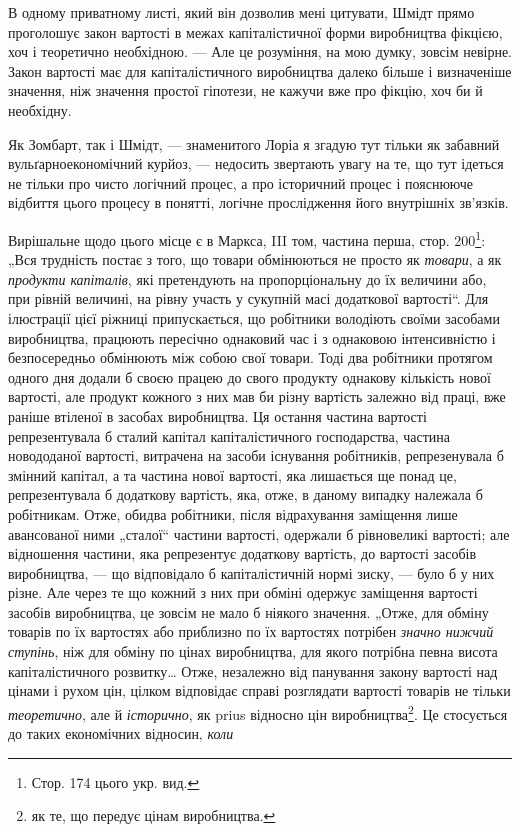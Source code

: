 \parcont{}  %
В одному приватному листі, який він дозволив мені цитувати, Шмідт прямо проголошує закон вартості в межах капіталістичної форми
виробництва фікцією, хоч і теоретично необхідною. — Але це розуміння, на мою думку, зовсім невірне. Закон вартості має для
капіталістичного виробництва далеко більше і визначеніше значення, ніж значення простої гіпотези, не кажучи вже про фікцію,
хоч би й необхідну.

Як Зомбарт, так і Шмідт, — знаменитого Лоріа я згадую тут тільки як забавний вульґарноекономічний
курйоз, — недосить звертають увагу на те, що тут ідеться не тільки про чисто логічний процес, а про історичний процес і
пояснююче відбиття цього процесу в понятті, логічне прослідження його внутрішніх зв’язків.

Вирішальне щодо цього місце є в
Маркса, III том, частина перша, стор. 200\footnote*{Стор. 174 цього укр. вид. }: „Вся трудність постає з того, що товари обмінюються не просто як \emph{товари}, а як
\emph{продукти капіталів}, які претендують на пропорціональну до їх величини або, при рівній величині, на рівну участь у сукупній
масі додаткової вартості“.  Для ілюстрації цієї ріжниці припускається, що робітники володіють своїми засобами виробництва,
працюють пересічно однаковий час і з однаковою інтенсивністю і безпосередньо обмінюють між собою свої товари. Тоді два
робітники протягом одного дня додали б своєю працею до свого продукту однакову кількість нової вартості, але продукт кожного
з них мав би різну вартість залежно від праці, вже раніше втіленої в засобах виробництва. Ця остання частина вартості
репрезентувала б сталий капітал капіталістичного господарства, частина новододаної вартості, витрачена на засоби існування
робітників, репрезенувала б змінний капітал, а та частина нової вартості, яка лишається ще понад це, репрезентувала б
додаткову вартість, яка, отже, в даному випадку належала б робітникам. Отже, обидва робітники, після відрахування заміщення
лише авансованої ними „сталої“ частини вартості, одержали б рівновеликі вартості; але відношення частини, яка репрезентує
додаткову вартість, до
вартості засобів виробництва, — що відповідало б капіталістичній нормі зиску, — було б у них різне. Але через те що кожний з них
при обміні одержує заміщення вартості засобів виробництва, це зовсім не мало б ніякого значення. „Отже, для обміну
товарів по їх вартостях або приблизно по їх вартостях потрібен \emph{значно нижчий ступінь}, ніж для обміну по цінах виробництва,
для якого потрібна певна висота капіталістичного розвитку\dots{} Отже, незалежно від панування закону вартості над цінами і
рухом цін, цілком відповідає справі розглядати вартості товарів не тільки \emph{теоретично}, але й \emph{історично}, як prius відносно цін
виробництва\footnote*{як те, що передує цінам виробництва. }. Це стосується до таких економічних відносин, \emph{коли}
\parbreak{}  %
